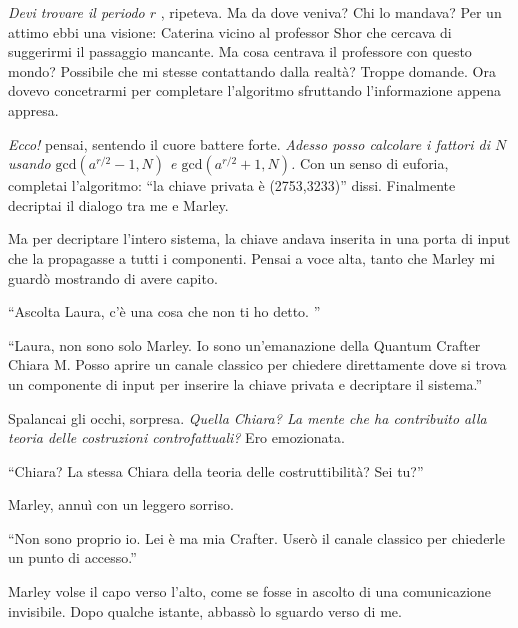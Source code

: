 \emph{Devi trovare il periodo \( r \) },  ripeteva.
 Ma da dove veniva? Chi lo mandava? Per un attimo ebbi una visione: Caterina vicino al professor Shor che cercava di suggerirmi il passaggio mancante. Ma cosa centrava il professore con questo mondo? Possibile che mi stesse contattando dalla realtà? Troppe domande. Ora dovevo concetrarmi per completare l'algoritmo sfruttando l'informazione appena appresa.

\emph{Ecco!} pensai, sentendo il cuore battere forte. \emph{Adesso posso calcolare i fattori di \( N \) usando \(\text{gcd}(a^{r/2} - 1, N)\) e \(\text{gcd}(a^{r/2} + 1, N)\).} Con un senso di euforia, completai l'algoritmo: ``la chiave privata è  (2753,3233)'' dissi.
Finalmente decriptai il dialogo tra me e Marley.

Ma per decriptare l'intero sistema, la chiave andava inserita  in una porta di input che la propagasse a tutti i componenti. Pensai a voce alta, tanto che Marley mi guardò mostrando di avere capito.
\begin{dialogue}
 \enquote{Ascolta Laura, c'è una cosa che non ti ho detto. }
\end{dialogue}

\begin{dialogue}
 \enquote{Laura, non sono solo Marley. Io sono un'emanazione della Quantum Crafter Chiara M. Posso aprire un canale classico per chiedere direttamente dove si trova un componente di input per inserire la chiave privata e decriptare il sistema.}
\end{dialogue}

Spalancai gli occhi, sorpresa. \emph{Quella Chiara? La mente che ha contribuito alla teoria delle costruzioni controfattuali?} Ero emozionata.

\begin{dialogue}
 \enquote{Chiara? La stessa Chiara  della teoria delle costruttibilità? Sei tu?}
\end{dialogue}

Marley, annuì con un leggero sorriso. 

\begin{dialogue}
 \enquote{Non sono proprio io. Lei è ma mia Crafter. Userò il canale classico per chiederle un punto di accesso.}
\end{dialogue}

Marley volse il capo verso l'alto, come se fosse in ascolto di una comunicazione invisibile. Dopo qualche istante, abbassò lo sguardo verso di me.

